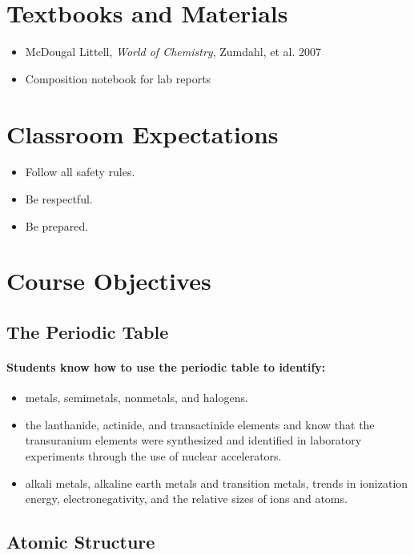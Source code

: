 \documentclass[12pt]{article}
\begin{document}
\section*{Textbooks and Materials}
\begin{itemize}
    \item McDougal Littell, \textit{World of Chemistry}, Zumdahl, et al. 2007
    \item Composition notebook for lab reports
\end{itemize}

\section*{Classroom Expectations}
\begin{itemize}
    \item Follow all safety rules.
    \item Be respectful.
    \item Be prepared.
\end{itemize}


\section{Course Objectives}

\subsection{The Periodic Table}

\paragraph{Students know how to use the periodic table to identify:}

\begin{itemize}
    \item metals, semimetals, nonmetals, and halogens.
    \item the lanthanide, actinide, and transactinide elements and know that the transuranium elements were synthesized and identified in laboratory experiments through the use of nuclear accelerators.
    \item alkali metals, alkaline earth metals and transition metals, trends in ionization energy, electronegativity, and the relative sizes of ions and atoms.
\end{itemize}


\subsection{Atomic Structure}
\end{document}
